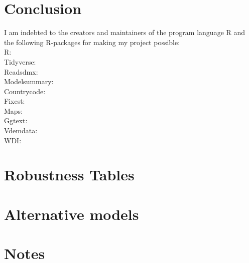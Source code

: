 \documentclass[12pt]{report} %
\begin{document}
\chapter{Conclusion}
 \label{chp:conclusion}



\newpage
\thispagestyle{empty}
\vspace*{\fill}
\begin{center}
    I am indebted to the creators and maintainers of the program language R and the following R-packages for making my project possible: \\
    R: \citet{r_core_team_r_2024} \\
    Tidyverse: \citet{wickham_welcome_2019} \\
    Readsdmx: \citet{queljoe_readsdmx_2023} \\
    Modelsummary: \citet{arel-bundock_modelsummary_2022} \\
    Countrycode: \citet{arel-bundock_countrycode_2018} \\
    Fixest: \citet{berge_efficient_2018} \\
    Maps: \citet{becker_maps_2024} \\
    Ggtext: \citet{wilke_ggtext_2022} \\
    Vdemdata: \citet{maerz_vdemdata_2025} \\
    WDI: \citet{arel-bundock_wdi_2022}
    
\end{center}
\vspace*{\fill}

\newpage

\appendix
\chapter{Robustness Tables} \label{apn:robust}


\chapter{Alternative models} \label{apn:models}


\chapter{Notes} \label{apn:notes}

\end{document}
